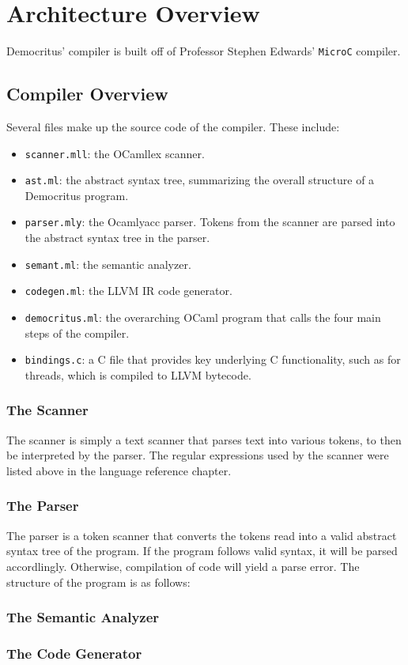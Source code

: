 \chapter{Architecture Overview}
	Democritus' compiler is built off of Professor Stephen Edwards' \texttt{MicroC} compiler. 

\section{Compiler Overview}
  Several files make up the source code of the compiler. These include:
  \begin{itemize}
    \item \texttt{scanner.mll}: the OCamllex scanner.     
    \item \texttt{ast.ml}: the abstract syntax tree, summarizing the overall structure of a Democritus program. 
    \item \texttt{parser.mly}: the Ocamlyacc parser. Tokens from the scanner are parsed into the abstract syntax tree in the parser.
    \item \texttt{semant.ml}: the semantic analyzer.
    \item \texttt{codegen.ml}: the LLVM IR code generator.
    \item \texttt{democritus.ml}: the overarching OCaml program that calls the four main steps of the compiler.
    \item \texttt{bindings.c}: a C file that provides key underlying C functionality, such as for threads, which is compiled to LLVM bytecode. 
  \end{itemize}
	\subsection{The Scanner}
    The scanner is simply a text scanner that parses text into various tokens, to then be interpreted by the parser. The regular expressions used by the scanner were listed above in the language reference chapter. 

	\subsection{The Parser}
    The parser is a token scanner that converts the tokens read into a valid abstract syntax tree of the program. If the program follows valid syntax, it will be parsed accordlingly. Otherwise, compilation of code will yield a parse error. The structure of the program is as follows:

	\subsection{The Semantic Analyzer}

	\subsection{The Code Generator}


